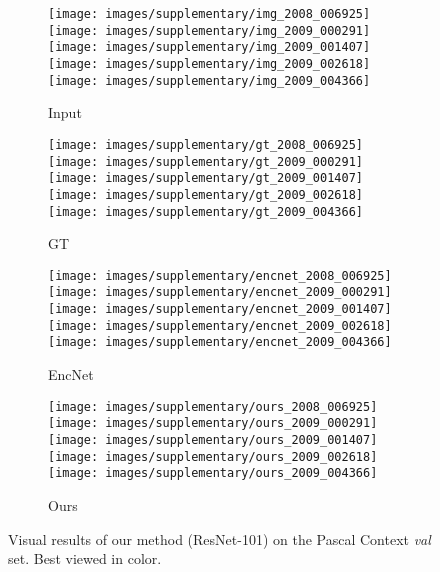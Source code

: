 \documentclass[10pt,twocolumn,letterpaper]{article}
\begin{document}
\begin{figure*}[!htb] 
\begin{center}
	\begin{subfigure}[b]{0.24\linewidth}
		\texttt{[image: images/supplementary/img\_2008\_006925]}\\
		\texttt{[image: images/supplementary/img\_2009\_000291]}\\
		\texttt{[image: images/supplementary/img\_2009\_001407]}\\
		\texttt{[image: images/supplementary/img\_2009\_002618]}\\
		\texttt{[image: images/supplementary/img\_2009\_004366]}\\
		\caption{Input}
    \end{subfigure}
    \hfill
	\begin{subfigure}[b]{0.24\linewidth}
		\texttt{[image: images/supplementary/gt\_2008\_006925]}\\
		\texttt{[image: images/supplementary/gt\_2009\_000291]}\\
		\texttt{[image: images/supplementary/gt\_2009\_001407]}\\
		\texttt{[image: images/supplementary/gt\_2009\_002618]}\\
		\texttt{[image: images/supplementary/gt\_2009\_004366]}\\
		\caption{GT}
    \end{subfigure}
    \hfill
	\begin{subfigure}[b]{0.24\linewidth}
		\texttt{[image: images/supplementary/encnet\_2008\_006925]}\\
		\texttt{[image: images/supplementary/encnet\_2009\_000291]}\\
		\texttt{[image: images/supplementary/encnet\_2009\_001407]}\\
		\texttt{[image: images/supplementary/encnet\_2009\_002618]}\\
		\texttt{[image: images/supplementary/encnet\_2009\_004366]}\\
		\caption{EncNet}
    \end{subfigure}
    \hfill
	\begin{subfigure}[b]{0.24\linewidth}
		\texttt{[image: images/supplementary/ours\_2008\_006925]}\\
		\texttt{[image: images/supplementary/ours\_2009\_000291]}\\
		\texttt{[image: images/supplementary/ours\_2009\_001407]}\\
		\texttt{[image: images/supplementary/ours\_2009\_002618]}\\
		\texttt{[image: images/supplementary/ours\_2009\_004366]}\\
		\caption{Ours}
    \end{subfigure}
\end{center}
	\caption{Visual results of our method (ResNet-101) on the Pascal Context \textit{val} set. Best viewed in color.}
\end{figure*}
\end{document}
